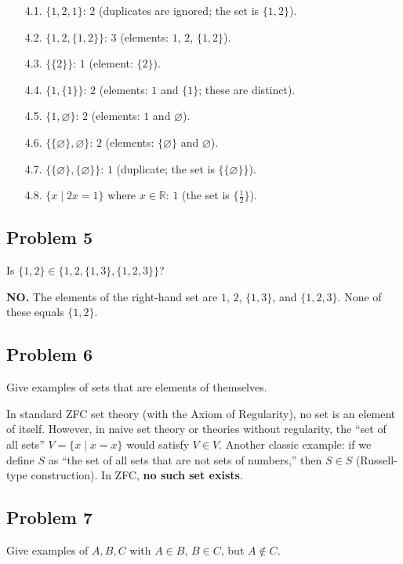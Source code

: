 \begin{itemize}
  \item[4.1.] $\{1,2,1\}$: $\boxed{2}$ (duplicates are ignored; the set is $\{1,2\}$).
  \item[4.2.] $\{1,2,\{1,2\}\}$: $\boxed{3}$ (elements: $1$, $2$, $\{1,2\}$).
  \item[4.3.] $\{\{2\}\}$: $\boxed{1}$ (element: $\{2\}$).
  \item[4.4.] $\{1,\{1\}\}$: $\boxed{2}$ (elements: $1$ and $\{1\}$; these are distinct).
  \item[4.5.] $\{1,\varnothing\}$: $\boxed{2}$ (elements: $1$ and $\varnothing$).
  \item[4.6.] $\{\{\varnothing\},\varnothing\}$: $\boxed{2}$ (elements: $\{\varnothing\}$ and $\varnothing$).
  \item[4.7.] $\{\{\varnothing\},\{\varnothing\}\}$: $\boxed{1}$ (duplicate; the set is $\{\{\varnothing\}\}$).
  \item[4.8.] $\{x \mid 2x=1\}$ where $x \in \mathbb{R}$: $\boxed{1}$ (the set is $\{\tfrac{1}{2}\}$).
\end{itemize}

\subsection*{Problem 5}
Is $\{1,2\} \in \{1,2,\{1,3\},\{1,2,3\}\}$?

\textbf{NO.} The elements of the right-hand set are $1$, $2$, $\{1,3\}$, and $\{1,2,3\}$. None of these equals $\{1,2\}$.

\subsection*{Problem 6}
Give examples of sets that are elements of themselves.

In standard ZFC set theory (with the Axiom of Regularity), no set is an element of itself. However, in naive set theory or theories without regularity, the ``set of all sets'' $V = \{x \mid x = x\}$ would satisfy $V \in V$. Another classic example: if we define $S$ as ``the set of all sets that are not sets of numbers,'' then $S \in S$ (Russell-type construction). In ZFC, \textbf{no such set exists}.

\subsection*{Problem 7}
Give examples of $A, B, C$ with $A \in B$, $B \in C$, but $A \notin C$.

